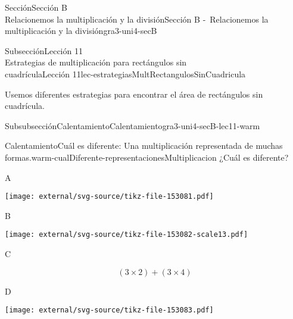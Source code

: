 \begin{sectionptx}{Sección}{{\Large Sección B\\}Relacionemos la multiplicación y la división}{}{Sección B -~Relacionemos la multiplicación y la división}{}{}{gra3-uni4-secB}
%
\clearpage
\begin{subsectionptx}{Subsección}{{\normalsize Lección 11\\[-0.05cm]}Estrategias de multiplicación para rectángulos sin\\cuadrícula}{}{Lección 11}{}{}{lec-estrategiasMultRectangulosSinCuadricula}
\begin{introduction}{}%
Usemos diferentes estrategias para encontrar el área de rectángulos sin cuadrícula.%
\end{introduction}%
%
%
\typeout{************************************************}
\typeout{************************************************}
%
\begin{subsubsectionptx}{Subsubsección}{Calentamiento}{}{Calentamiento}{}{}{gra3-uni4-secB-lec11-warm}
\begin{exploration}{Calentamiento}{Cuál es diferente: Una multiplicación representada de muchas formas.}{warm-cualDiferente-representacionesMultiplicacion}%
¿Cuál es diferente?%
\begin{sidebyside}{2}{0.05}{0.05}{0.1}%
\begin{sbspanel}{0.4}%
A%
\par
\texttt{[image: external/svg-source/tikz-file-153081.pdf]}
\end{sbspanel}%
\begin{sbspanel}{0.4}%
B%
\par
\texttt{[image: external/svg-source/tikz-file-153082-scale13.pdf]}
\end{sbspanel}%
\end{sidebyside}%
\begin{sidebyside}{2}{0.05}{0.05}{0.1}%
\begin{sbspanel}{0.4}%
C%
\par
%
\begin{equation*}
(3\times 2) + (3\times 4)
\end{equation*}
%
\end{sbspanel}%
\begin{sbspanel}{0.4}%
D%
\par
\texttt{[image: external/svg-source/tikz-file-153083.pdf]}
\end{sbspanel}%
\end{sidebyside}%
\end{exploration}%
\end{subsubsectionptx}
%
%
\typeout{************************************************}

\end{subsectionptx}
\end{sectionptx}
